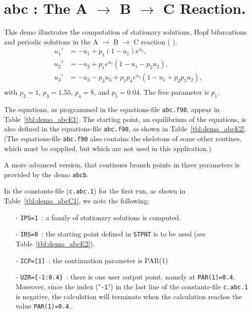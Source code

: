 \documentclass[12pt]{report}
\begin{document}
\newpage
\section{ abc : The A \texorpdfstring{$\to$}{to} B 
\texorpdfstring{$\to$}{to} C Reaction.} \label{sec:Demos_abc}
This demo illustrates the computation of 
stationary solutions,
Hopf bifurcations 
and
periodic solutions
in the A $\to$ B $\to$ C reaction 
( \citeyear{DoHe:83}).
\begin{equation} \begin{array}{cl}
  u_1 ' &=  -u_1 + p_1 (1-u_1) e^{u_3}, \\
  u_2 ' &=  -u_2 +  p_1 e^{u_3} ( 1-u_1 - p_5 u_2 ),\\
  u_3 ' &=  -u_3 - p_3 u_3 + p_1 p_4 e^{u_3}  
  ( 1-u_1 + p_2 p_5 u_2 ),\\ \end{array} \end{equation}
with $p_2=1$, $p_3=1.55$, $p_4=8$, and $p_5=0.04$. 
The free parameter is $p_1$.

The equations, as programmed in the equations-file {\tt abc.f90},
appear in Table~\ref{tbl:demo_abcE1}.
The starting point, an equilibrium of the equations,
is also defined in  the equations-file {\tt abc.f90},
as shown in  Table~\ref{tbl:demo_abcE2}.
(The equations-file {\tt abc.f90} also contains the skeletons
of some other routines, which must be supplied, but which 
are not used in this application.)

A more advanced version, that continues branch points in three
parameters is provided by the demo {\tt abcb}.

In the constants-file ({\tt c.abc.1}) for the first run, as shown in 
Table~\ref{tbl:demo_abcC1}, we note the following:

\begin{itemize}
\item[-] {\tt IPS=1}~: a family of stationary solutions is computed.

\item[-] {\tt IRS=0}~: the starting point defined in {\tt STPNT} 
	 is to be used (see  Table~\ref{tbl:demo_abcE2}). 

\item[-] {\tt ICP=[1]}~: the continuation parameter is PAR(1) 

\item[-] {\tt UZR=\{-1:0.4\}}~: there is one user output point, namely at
	 {\tt PAR(1)=0.4}. Moreover, since the index ("{\tt -1}") in
	 the last line of the constants-file {\tt c.abc.1} is negative, 
	 the calculation will terminate when the calculation reaches
	 the value {\tt PAR(1)=0.4}..
\end{itemize}
\end{document}
